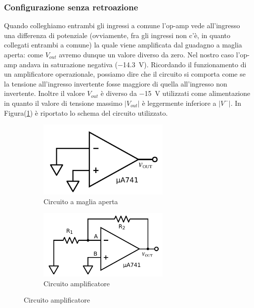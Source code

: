 \subsubsection{Configurazione senza retroazione}

Quando colleghiamo entrambi gli ingressi a comune l'op-amp vede all'ingresso una differenza di potenziale (ovviamente, fra gli ingressi non c'è, in quanto collegati entrambi a comune) la quale viene amplificata dal guadagno a maglia aperta: come $V_{out}$ avremo dunque un valore diverso da zero. Nel nostro caso l'op-amp andava in saturazione negativa (\SI{-14.3}{\volt}). Ricordando il funzionamento di un amplificatore operazionale, possiamo dire che il circuito si comporta come se la tensione all'ingresso invertente fosse maggiore di quella all'ingresso non invertente. Inoltre il valore $V_{out}$ è diverso da \SI{-15}{\volt} utilizzati come alimentazione in quanto il valore di tensione massimo $|V_{out}|$ è leggermente inferiore a $|V^-|$. In Figura(\ref{cir:open_loop}) è riportato lo schema del circuito utilizzato.

\begin{figure}[ht]
        \centering
        \begin{subfigure}[b]{0.35\textwidth}
                 \includegraphics[width=0.70\textwidth]{../E02/latex/open_loop.pdf}
                \caption{Circuito a maglia aperta}
                \label{cir:open_loop}
        \end{subfigure}%
    \quad
        \begin{subfigure}[b]{0.35\textwidth}
               \includegraphics[width=0.70\textwidth]{../E02/latex/inv.pdf}
                \caption{Circuito amplificatore}
                \label{cir:inv}
        \end{subfigure}
     
\end{figure}

